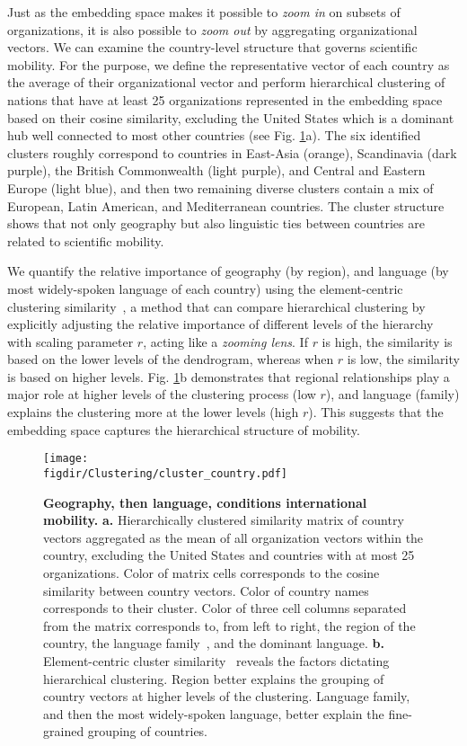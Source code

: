 \documentclass[12pt]{article} %
\def\figdir{../Figs}
\begin{document}
Just as the embedding space makes it possible to \textit{zoom in} on subsets of organizations, it is also possible to \textit{zoom out}  by aggregating organizational vectors.
We can examine the country-level structure that governs scientific mobility.
For the purpose, we define the representative vector of each country as the average of their organizational vector and perform hierarchical clustering of nations that have at least 25 organizations represented in the embedding space based on their cosine similarity, excluding the United States which is a dominant hub well connected to most other countries (see Fig. \ref{fig:clustering}a).
The six identified clusters roughly correspond to countries in East-Asia (orange), Scandinavia (dark purple), the British Commonwealth (light purple), and Central and Eastern Europe (light blue), and then two remaining diverse clusters contain a mix of European, Latin American, and Mediterranean countries.
The cluster structure shows that not only geography but also linguistic ties between countries are related to scientific mobility.

We quantify the relative importance of geography (by region), and language (by most widely-spoken language of each country) using the element-centric clustering similarity~\autocite{gates2019element}, a method that can compare hierarchical clustering by explicitly adjusting the relative importance of different levels of the hierarchy with scaling parameter $r$, acting like a \textit{zooming lens}.
If $r$ is high, the similarity is based on the lower levels of the dendrogram, whereas when $r$ is low, the similarity is based on higher levels.
Fig. \ref{fig:clustering}b demonstrates that regional relationships play a major role at higher levels of the clustering process (low $r$), and language (family) explains the clustering more at the lower levels (high $r$).
This suggests that the embedding space captures the hierarchical structure of mobility.


%
%
\begin{figure}[p!]
	\centering
	\texttt{[image: \\figdir/Clustering/cluster\_country.pdf]}
	\caption{
		\textbf{Geography, then language, conditions international mobility.}
		\textbf{a.} Hierarchically clustered similarity matrix of country vectors aggregated as the mean of all organization vectors within the country, excluding the United States and countries with at most 25 organizations.
		Color of matrix cells corresponds to the cosine similarity between country vectors.
		Color of country names corresponds to their cluster.
		Color of three cell columns separated from the matrix corresponds to, from left to right, the region of the country, the language family~\autocite{ethnologue}, and the dominant language.
		\textbf{b.}	Element-centric cluster similarity~\autocite{gates2019element} reveals the factors dictating hierarchical clustering.
		Region better explains the grouping of country vectors at higher levels of the clustering.
		Language family, and then the most widely-spoken language, better explain the fine-grained grouping of countries.
	}
	\label{fig:clustering}
\end{figure}
\end{document}
